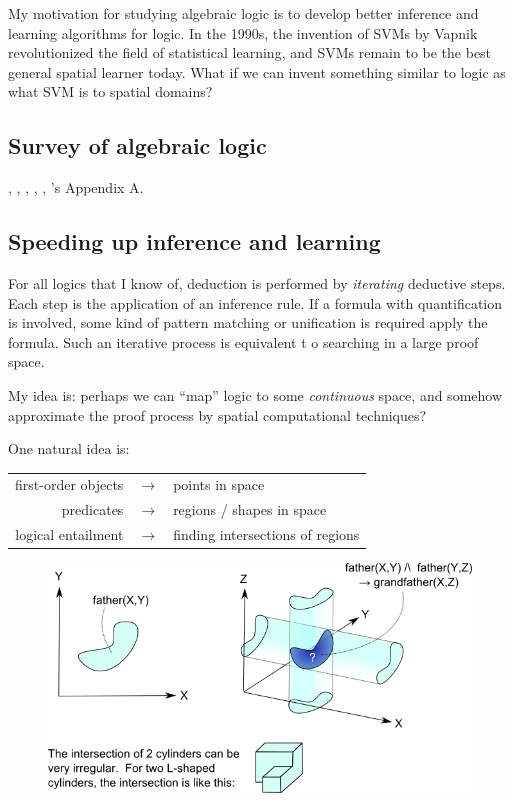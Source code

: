 My motivation for studying algebraic logic is to develop better inference and learning algorithms for logic.  In the 1990s, the invention of SVMs by Vapnik revolutionized the field of statistical learning, and SVMs remain to be the best general spatial learner today.  What if we can invent something similar to logic as what SVM is to spatial domains?

\subsection{Survey of algebraic logic}

\citep*{Halmos1962}, \citep*{Andreka2001}, \citep*{Halmos1988}, \citep*{Craig1974}, \citep*{Plotkin1994}, \citep*{Lawvere2003}'s Appendix A.


\subsection{Speeding up inference and learning}

For all logics that I know of, deduction is performed by \textit{iterating} deductive steps.  Each step is the application of an inference rule.  If a formula with quantification is involved, some kind of pattern matching or unification is required apply the formula.  Such an iterative process is equivalent t o searching in a large proof space.

My idea is:  perhaps we can ``map'' logic to some \textit{continuous} space, and somehow approximate the proof process by spatial computational techniques?

One natural idea is:

\tab \begin{tabular}{rll}
first-order objects & $\longrightarrow$ & points in space\\
predicates          & $\longrightarrow$ & regions / shapes in space\\
logical entailment  & $\longrightarrow$ & finding intersections of regions\\
\end{tabular}

\begin{figure}[H]
\centering
\includegraphics[scale=1.0]{cylindrical-logic.png}
\end{figure}

